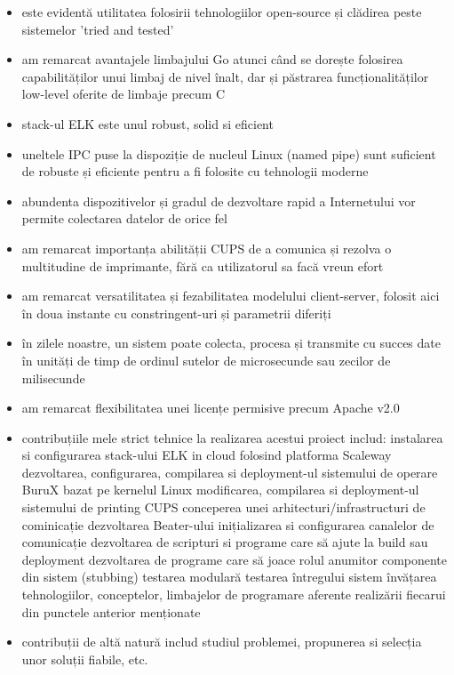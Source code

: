 \documentclass[a4paper, 12pt, twoside]{report}
\begin{document}
{\begin{itemize}
	\item este evidentă utilitatea folosirii tehnologiilor open-source și clădirea peste sistemelor 'tried and tested'
	\item am remarcat avantajele limbajului Go atunci când se dorește folosirea capabilităților unui limbaj de nivel înalt, dar și păstrarea funcționalităților low-level oferite de limbaje precum C
	\item stack-ul ELK este unul robust, solid si eficient
	\item uneltele IPC puse la dispoziție de nucleul Linux (named pipe) sunt suficient de robuste și eficiente pentru a fi folosite cu tehnologii moderne
	\item abundenta dispozitivelor și gradul de dezvoltare rapid a Internetului vor permite colectarea datelor de orice fel
	\item am remarcat importanța abilității CUPS de a comunica și rezolva o multitudine de imprimante, fără ca utilizatorul sa facă vreun efort
	\item am remarcat versatilitatea și fezabilitatea modelului client-server, folosit aici în doua instante cu constringent-uri și parametrii diferiți
	\item în zilele noastre, un sistem poate colecta, procesa și transmite cu succes date în unități de timp de ordinul sutelor de microsecunde sau zecilor de milisecunde
	\item am remarcat flexibilitatea unei licențe permisive precum Apache v2.0
	\item contribuțiile mele strict tehnice la realizarea acestui proiect includ:
		\subitem instalarea si configurarea stack-ului ELK in cloud folosind platforma Scaleway
		\subitem dezvoltarea, configurarea, compilarea si deployment-ul sistemului de operare BuruX bazat pe kernelul Linux
		\subitem modificarea, compilarea si deployment-ul sistemului de printing CUPS
		\subitem conceperea unei arhitecturi/infrastructuri de cominicație
		\subitem dezvoltarea Beater-ului
		\subitem inițializarea si configurarea canalelor de comunicație
		\subitem dezvoltarea de scripturi si programe care să ajute la build sau deployment
		\subitem dezvoltarea de programe care să joace rolul anumitor componente din sistem (stubbing)
		\subitem testarea modulară
		\subitem testarea întregului sistem
		\subitem învățarea tehnologiilor, conceptelor, limbajelor de programare aferente realizării fiecarui din punctele anterior menționate
	\item contribuții de altă natură includ studiul problemei, propunerea si selecția unor soluții fiabile, etc.

\end{itemize}}
\end{document}
